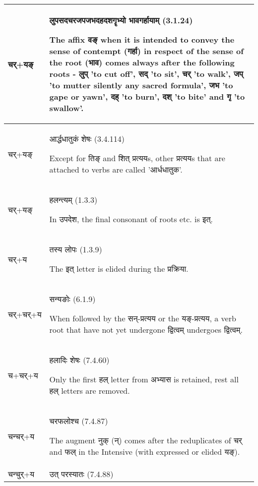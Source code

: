 		\begin{longtable}{ |p{1.8cm}|p{14.2cm}| } 
			\hline
			\rowcolor{red!10}
			\texthindi{चर्}+\texthindi{यङ्}
			&\texthindi{लुपसदचरजपजभदहदशगॄभ्यो भावगर्हायाम्} (3.1.24)
			
			The affix \texthindi{वङ्} when it is intended to convey the sense of contempt (\texthindi{गर्हा}) in respect of the sense of the root (\texthindi{भाव}) comes always after the following roots - \texthindi{लुप्} 'to cut off', \texthindi{सद्} 'to sit', \texthindi{चर्} 'to walk', \texthindi{जप्} 'to mutter silently any sacred formula', \texthindi{जभ} 'to gape or yawn', \texthindi{दह्} 'to burn', \texthindi{दश्} 'to bite' and \texthindi{गृ} 'to swallow'. 
			\\\hline
			\rowcolor{blue!10}
			\texthindi{चर्}+\texthindi{यङ्}
			&\texthindi{आर्द्धधातुकं शेषः}  (3.4.114)
			
			Except for \texthindi{तिङ्} and \texthindi{शित् प्रत्यय}s, other \texthindi{प्रत्यय}s that are attached to verbs are called '\texthindi{आर्धधातुक}'. 
			\\\hline
			\rowcolor{blue!10}
			\texthindi{चर्}+\texthindi{यङ्}
			&\texthindi{हलन्त्यम्} (1.3.3)
			
			In \texthindi{उपदेश}, the final consonant of roots etc. is \texthindi{इत्}.
			\\\hline
			\rowcolor{blue!10}
			\texthindi{चर्}+\texthindi{य}
			&\texthindi{तस्य लोपः} (1.3.9)
			
			The \texthindi{इत्} letter is elided during the \texthindi{प्रक्रिया}.
			\\\hline
			\rowcolor{green!10}
			\texthindi{चर्}+\texthindi{चर्}+\texthindi{य}
			&\texthindi{सन्यङोः} (6.1.9)
			
			When followed by the \texthindi{सन्-प्रत्यय} or the \texthindi{यङ्-प्रत्यय}, a verb root that have not yet undergone \texthindi{द्वित्वम्} undergoes \texthindi{द्वित्वम्}.
			\\\hline
			\rowcolor{green!10}
			\texthindi{च}+\texthindi{चर्}+\texthindi{य}
			&\texthindi{हलादिः शेषः} (7.4.60)
			
			Only the first \texthindi{हल्} letter from अभ्यास is retained, rest all \texthindi{हल्} letters are removed. 
			\\\hline
			\rowcolor{green!10}
			\texthindi{चन्चर्}+\texthindi{य}
			&\texthindi{चरफलोश्च} (7.4.87)
			
			The augment \texthindi{नुक् (न्)} comes after the reduplicates of \texthindi{चर्} and \texthindi{फल्} in the Intensive (with expressed or elided \texthindi{यङ्}).
			\\\hline
			\rowcolor{green!10}
			\texthindi{चन्चुर्}+\texthindi{य}
			&\texthindi{उत्‌ परस्यातः} (7.4.88) 
			

\end{longtable}
